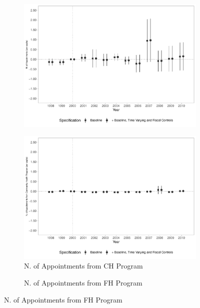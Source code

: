 \begin{figure}[h!]
\begin{center}
\begin{subfigure}{0.32\textwidth}
        \includegraphics[width=\textwidth]{plots/siab_cons_especif_pcapita_dist_ec29_baseline_dist_ec29_baseline_12.pdf}
    \end{subfigure}
    \begin{subfigure}{0.32\textwidth}
        \centering
        \caption{\scriptsize N. of Appointments from CH Program}\label{fig:12h}
        \includegraphics[width=\textwidth]{plots/siab_cons_especif_pacs_pcapita_dist_ec29_baseline_dist_ec29_baseline_12.pdf}
    \end{subfigure}
    \begin{subfigure}{0.32\textwidth}
        \centering
        \caption{\scriptsize N. of Appointments from FH Program}\label{fig:12i}

\end{subfigure}
\end{center}
\end{figure}
